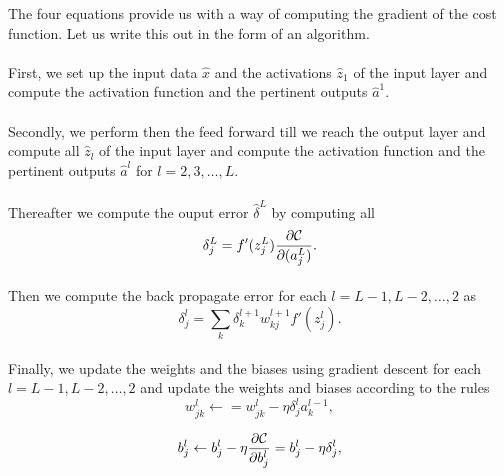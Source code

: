 \documentclass[%
oneside,                 %
final,                   %
10pt]{article}
\begin{document}
The four equations  provide us with a way of computing the gradient of the cost function. Let us write this out in the form of an algorithm.


\paragraph{}
First, we set up the input data $\hat{x}$ and the activations
$\hat{z}_1$ of the input layer and compute the activation function and
the pertinent outputs $\hat{a}^1$.




\paragraph{}
Secondly, we perform then the feed forward till we reach the output
layer and compute all $\hat{z}_l$ of the input layer and compute the
activation function and the pertinent outputs $\hat{a}^l$ for
$l=2,3,\dots,L$.




\paragraph{}
Thereafter we compute the ouput error $\hat{\delta}^L$ by computing all
\[
\delta_j^L = f'(z_j^L)\frac{\partial {\cal C}}{\partial (a_j^L)}.
\]




\paragraph{}
Then we compute the back propagate error for each $l=L-1,L-2,\dots,2$ as
\[
\delta_j^l = \sum_k \delta_k^{l+1}w_{kj}^{l+1}f'(z_j^l).
\]




\paragraph{}
Finally, we update the weights and the biases using gradient descent for each $l=L-1,L-2,\dots,2$ and update the weights and biases according to the rules
\[
w_{jk}^l\leftarrow  = w_{jk}^l- \eta \delta_j^la_k^{l-1},
\]

\[
b_j^l \leftarrow b_j^l-\eta \frac{\partial {\cal C}}{\partial b_j^l}=b_j^l-\eta \delta_j^l,
\]
\end{document}
